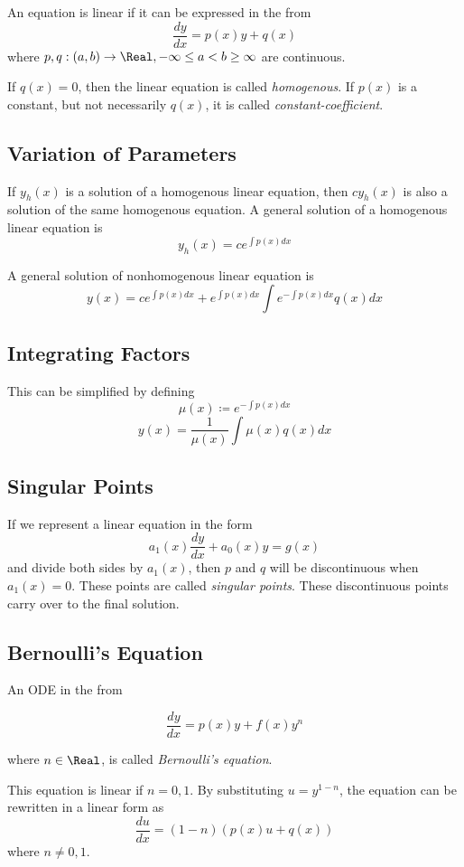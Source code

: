 \begin{definition}
    An equation is linear if it can be expressed in the from
    \[
        \frac{dy}{dx} = p(x)y + q(x)
    \]
    where $p,q : (a,b) \rightarrow \Real, -\infty \le a < b \ge \infty$ are continuous.
\end{definition}

If $q(x) = 0$, then the linear equation is called \textit{homogenous}. If $p(x)$ is a constant, but not necessarily $q(x)$, it is called \textit{constant-coefficient}.

\subsection{Variation of Parameters}

If $y_h(x)$ is a solution of a homogenous linear equation, then $cy_h(x)$ is also a solution of the same homogenous equation. A general solution of a homogenous linear equation is
\[
    y_h(x) = ce^{\int p(x)dx}
\]

A general solution of nonhomogenous linear equation is
\[
    y(x) = ce^{\int p(x)dx} + e^{\int p(x)dx}\int e^{-\int p(x)dx}q(x)dx
\]

\subsection{Integrating Factors}

This can be simplified by defining
\[
    \mu(x) \coloneq e^{-\int p(x)dx}
\]
\[
    y(x) = \frac{1}{\mu(x)}\int \mu(x)q(x)dx
\]

\subsection{Singular Points}

If we represent a linear equation in the form
\[
    a_1(x)\frac{dy}{dx} + a_0(x)y = g(x)
\]
and divide both sides by $a_1(x)$, then $p$ and $q$ will be discontinuous when $a_1(x) = 0$. These points are called \textit{singular points}. These discontinuous points carry over to the final solution.

\subsection{Bernoulli's Equation}

An ODE in the from

\[
    \frac{dy}{dx} = p(x)y + f(x)y^n
\]

where $n \in \Real$, is called \textit{Bernoulli's equation}.

This equation is linear if $n = 0, 1$. By substituting $u = y^{1-n}$, the equation can be rewritten in a linear form as
\[
    \frac{du}{dx} = (1 - n)(p(x)u + q(x))
\]
where $n \ne 0,1$.